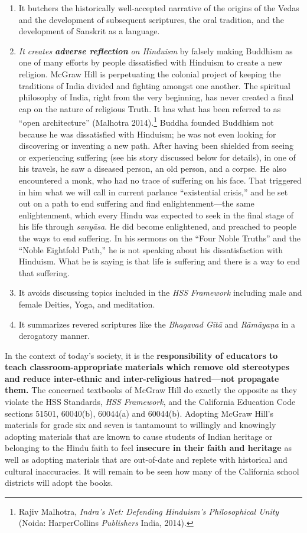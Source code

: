 \begin{enumerate}
\item It butchers the historically well-accepted narrative of the origins of the Vedas and the development of subsequent scriptures, the oral tradition, and the  development of Sanskrit as a language. 

\item \textit{It creates} \textit{\textbf{adverse reflection}} \textit{ on Hinduism} by falsely making Buddhism as one of many efforts by people dissatisfied with Hinduism to create a new religion. McGraw Hill is perpetuating the colonial project of keeping the traditions of India divided and fighting amongst one another. The spiritual philosophy of India, right from the very beginning, has never created a final cap on the nature of religious Truth. It has what has been referred to as “open architecture” (Malhotra 2014).\footnote{Rajiv Malhotra, \textit{Indra’s Net: Defending Hinduism’s Philosophical Unity} (Noida: HarperCollins \textit{Publishers} India, 2014).} Buddha founded Buddhism not because he was dissatisfied with Hinduism; he was not even looking for discovering or inventing a new path. After having been shielded from seeing or experiencing suffering (see his story discussed below for details), in one of his travels, he saw a diseased person, an old person, and a corpse. He also encountered a monk, who had no trace of suffering on his face. That triggered in him what we will call in current parlance “existential crisis,” and he set out on a path to end suffering and find enlightenment—the same enlightenment, which every Hindu was expected to seek in the final stage of his life through \textit{sanyāsa}. He did become enlightened, and preached to people the ways to end suffering. In his sermons on the “Four Noble Truths” and the “Noble Eightfold Path,” he is not speaking about his dissatisfaction with Hinduism. What he is saying is that life is suffering and there is a way to end that suffering. 

\item It avoids discussing topics included in the \textit{HSS Framework} including male and female Deities, Yoga, and meditation.
\item It summarizes revered scriptures like the \textit{Bhagavad Gītā} and \textit{Rāmāyaṇa} in a derogatory manner.
\end{enumerate}
In the context of today’s society, it is the \textbf{responsibility of educators to teach classroom-appropriate materials which remove old stereotypes and reduce inter-ethnic and inter-religious hatred—not propagate them.} The concerned textbooks of McGraw Hill do exactly the opposite as they violate the HSS Standards, \textit{HSS Framework}, and the California Education Code sections 51501, 60040(b), 60044(a) and 60044(b). Adopting McGraw Hill’s materials for grade six and seven is tantamount to willingly and knowingly adopting materials that are known to cause students of Indian heritage or belonging to the Hindu faith to feel \textbf{insecure in their faith and heritage} as well as adopting materials that are out-of-date and replete with historical and cultural inaccuracies. It will remain to be seen how many of the California school districts will adopt the books. 

